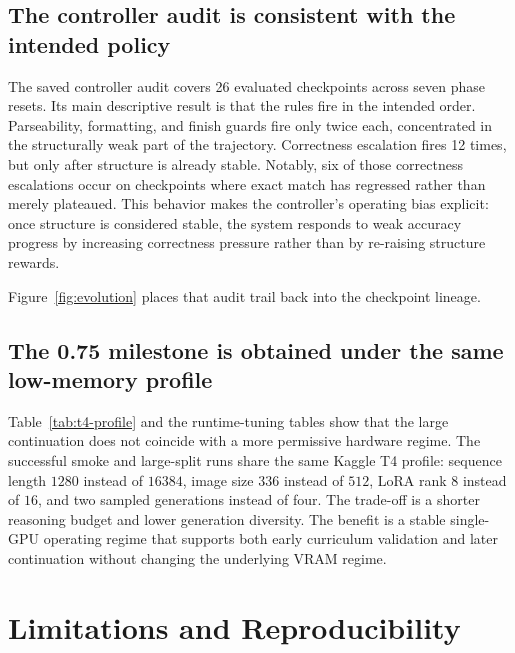 \documentclass{article} %
\begin{document}
\subsection{The controller audit is consistent with the intended policy}

The saved controller audit covers 26 evaluated checkpoints across seven phase resets. Its main descriptive result is that the rules fire in the intended order. Parseability, formatting, and finish guards fire only twice each, concentrated in the structurally weak part of the trajectory. Correctness escalation fires 12 times, but only after structure is already stable. Notably, six of those correctness escalations occur on checkpoints where exact match has regressed rather than merely plateaued. This behavior makes the controller's operating bias explicit: once structure is considered stable, the system responds to weak accuracy progress by increasing correctness pressure rather than by re-raising structure rewards.

Figure~\ref{fig:evolution} places that audit trail back into the checkpoint lineage.

\subsection{The 0.75 milestone is obtained under the same low-memory profile}

Table~\ref{tab:t4-profile} and the runtime-tuning tables show that the large continuation does not coincide with a more permissive hardware regime. The successful smoke and large-split runs share the same Kaggle T4 profile: sequence length $1280$ instead of $16384$, image size $336$ instead of $512$, LoRA rank $8$ instead of $16$, and two sampled generations instead of four. The trade-off is a shorter reasoning budget and lower generation diversity. The benefit is a stable single-GPU operating regime that supports both early curriculum validation and later continuation without changing the underlying VRAM regime.

\section{Limitations and Reproducibility}
\end{document}
